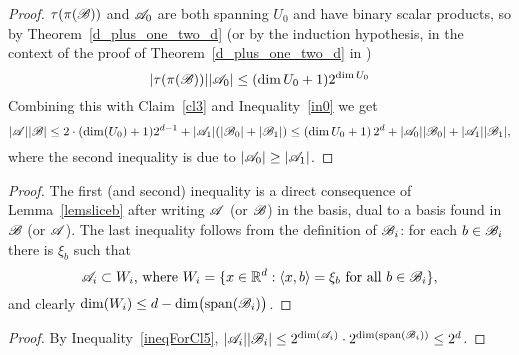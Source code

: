 \ineqkey*
\begin{proof}
    $\tau(\pi({\mathscr{B}}))$ and ${\mathscr{A}}_0$ are both spanning $U_0$ and have binary scalar products, so by Theorem~\ref{d_plus_one_two_d} (or by the induction hypothesis, in the context of the proof of Theorem~\ref{d_plus_one_two_d} in \cite{kupavskii22})
    \[
        |\tau(\pi({\mathscr{B}}))||{\mathscr{A}}_0| \leq (\operatorname{dim}U_0+1)2^{\operatorname{dim}U_0}
    \]
    Combining this with Claim~\ref{cl3} and Inequality~\ref{in0} we get
    \[
        |{\mathscr{A}}||{\mathscr{B}}| \leq 2 \cdot (\operatorname{dim}(U_0)+1)2^{d - 1} + |{\mathscr{A}}_1|(|{\mathscr{B}}_0| + |{\mathscr{B}}_1|) \leq \left(\operatorname{dim}U_0+1\right)2^d + |{\mathscr{A}}_0||{\mathscr{B}}_0| + |{\mathscr{A}}_1||{\mathscr{B}}_1|,
    \]
    where the second inequality is due to $|{\mathscr{A}}_0| \geq |{\mathscr{A}}_1|$.
\end{proof}

\ineqforclfive*
\begin{proof}
    The first (and second) inequality is a direct consequence of Lemma~\ref{lemsliceb} after writing ${\mathscr{A}}$ (or ${\mathscr{B}}$) in the basis, dual to a basis found in ${\mathscr{B}}$ (or ${\mathscr{A}}$). The last inequality follows from the definition of ${\mathscr{B}}_i$: for each $b \in {\mathscr{B}}_i$ there is $\xi_b$ such that 
    \[
        {\mathscr{A}}_i \subset W_i\text{, where }W_i = \{ x \in {\mathbb{R}}^d : \langle x,b\rangle = \xi_b \text{ for all } b \in {\mathscr{B}}_i \},
    \] 
    and clearly $\operatorname{dim}(W_i) \leq d - \operatorname{dim}\bigl(\operatorname{span}({\mathscr{B}}_i)\bigr)$.
\end{proof}

\claimaaaibbi*
\begin{proof}
    By Inequality~\ref{ineqForCl5}, $|{\mathscr{A}}_i||{\mathscr{B}}_i| \leq 2^{\operatorname{dim}({\mathscr{A}}_i)} \cdot 2^{\operatorname{dim}(\operatorname{span}({\mathscr{B}}_i))} \leq 2^d$.
\end{proof}

